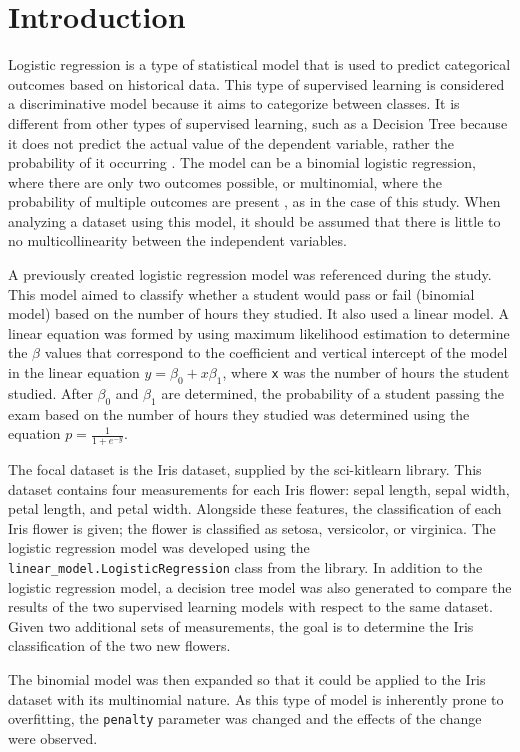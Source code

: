 \documentclass[journal]{IEEEtran}
\begin{document}
\section{Introduction}
Logistic regression is a type of statistical model that is used to predict categorical outcomes based on historical data. This type of supervised learning is considered a discriminative model because it aims to categorize between classes. It is different from other types of supervised learning, such as a Decision Tree because it does not predict the actual value of the dependent variable, rather the probability of it occurring \cite{b1}. The model can be a binomial logistic regression, where there are only two outcomes possible, or multinomial, where the probability of multiple outcomes are present \cite{b2}, as in the case of this study. When analyzing a dataset using this model, it should be assumed that there is little to no multicollinearity between the independent variables.

A previously created logistic regression model \cite{b3} was referenced during the study. This model aimed to classify whether a student would pass or fail (binomial model) based on the number of hours they studied. It also used a linear model. A linear equation was formed by using maximum likelihood estimation \cite{b1} to determine the $\beta$ values that correspond to the coefficient and vertical intercept of the model in the linear equation \( y = \beta_0 + x\beta_1\), where \lstinline{x} was the number of hours the student studied. After $\beta_0$ and $\beta_1$ are determined, the probability of a student passing the exam based on the number of hours they studied was determined using the equation \(p=\frac{1}{1+e^{-y}}\). 

The focal dataset is the Iris dataset, supplied by the sci-kitlearn library. This dataset contains four measurements for each Iris flower: sepal length, sepal width, petal length, and petal width. Alongside these features, the classification of each Iris flower is given; the flower is classified as setosa, versicolor, or virginica. The logistic regression model was developed using the \lstinline{linear_model.LogisticRegression} class from the library. In addition to the logistic regression model, a decision tree model was also generated to compare the results of the two supervised learning models with respect to the same dataset. Given two additional sets of measurements, the goal is to determine the Iris classification of the two new flowers.

The binomial model was then expanded so that it could be applied to the Iris dataset with its multinomial nature. As this type of model is inherently prone to overfitting, the \lstinline{penalty} parameter was changed and the effects of the change were observed. 
\end{document}
